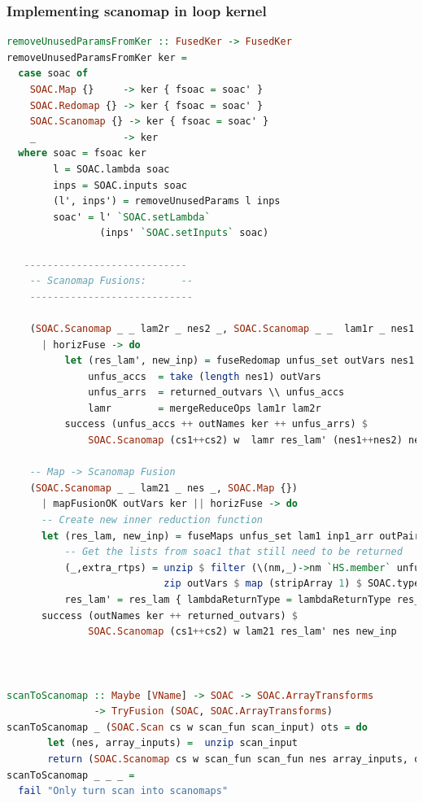 \documentclass[11pt,bibliography=totocnumbered]{article}
\begin{document}
\subsubsection{Implementing scanomap in loop kernel}
\begin{lstlisting}[language=Haskell,caption=Scanomap implementation in loop kernel] 
removeUnusedParamsFromKer :: FusedKer -> FusedKer
removeUnusedParamsFromKer ker =
  case soac of
    SOAC.Map {}     -> ker { fsoac = soac' }
    SOAC.Redomap {} -> ker { fsoac = soac' }
    SOAC.Scanomap {} -> ker { fsoac = soac' }
    _               -> ker
  where soac = fsoac ker
        l = SOAC.lambda soac
        inps = SOAC.inputs soac
        (l', inps') = removeUnusedParams l inps
        soac' = l' `SOAC.setLambda`
                (inps' `SOAC.setInputs` soac)
                
   ----------------------------
    -- Scanomap Fusions:      --
    ----------------------------

    (SOAC.Scanomap _ _ lam2r _ nes2 _, SOAC.Scanomap _ _  lam1r _ nes1 _)
      | horizFuse -> do
          let (res_lam', new_inp) = fuseRedomap unfus_set outVars nes1 lam1 inp1_arr outPairs lam2 inp2_arr
              unfus_accs  = take (length nes1) outVars
              unfus_arrs  = returned_outvars \\ unfus_accs
              lamr        = mergeReduceOps lam1r lam2r
          success (unfus_accs ++ outNames ker ++ unfus_arrs) $
              SOAC.Scanomap (cs1++cs2) w  lamr res_lam' (nes1++nes2) new_inp

    -- Map -> Scanomap Fusion
    (SOAC.Scanomap _ _ lam21 _ nes _, SOAC.Map {})
      | mapFusionOK outVars ker || horizFuse -> do
      -- Create new inner reduction function
      let (res_lam, new_inp) = fuseMaps unfus_set lam1 inp1_arr outPairs lam2 inp2_arr
          -- Get the lists from soac1 that still need to be returned
          (_,extra_rtps) = unzip $ filter (\(nm,_)->nm `HS.member` unfus_set) $
                           zip outVars $ map (stripArray 1) $ SOAC.typeOf soac1
          res_lam' = res_lam { lambdaReturnType = lambdaReturnType res_lam ++ extra_rtps }
      success (outNames ker ++ returned_outvars) $
              SOAC.Scanomap (cs1++cs2) w lam21 res_lam' nes new_inp
  
  
              
scanToScanomap :: Maybe [VName] -> SOAC -> SOAC.ArrayTransforms
               -> TryFusion (SOAC, SOAC.ArrayTransforms)
scanToScanomap _ (SOAC.Scan cs w scan_fun scan_input) ots = do
       let (nes, array_inputs) =  unzip scan_input
       return (SOAC.Scanomap cs w scan_fun scan_fun nes array_inputs, ots)
scanToScanomap _ _ _ =
  fail "Only turn scan into scanomaps"
\end{lstlisting}
\end{document}
